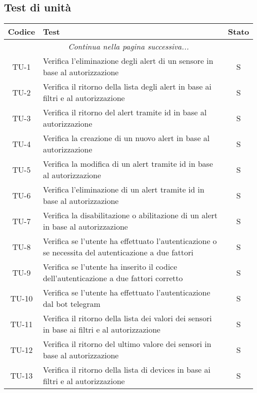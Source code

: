 	\subsection{Test di unità}

		\begin{center}
			\begin{longtable}{|c|p{12cm}|c|}
			\hline
			\rowcolor{lighter-grayer}
			\textbf{Codice} & \textbf{Test} & \textbf{Stato}  \\ %
			\hline
			\endhead
			\hline
	        \multicolumn{3}{|c|}{\textit{Continua nella pagina successiva...}}\\
	        \hline
	        \endfoot
	        \endlastfoot

			\hline
			TU-1 & Verifica l'eliminazione degli alert di un sensore in base al autorizzazione & S \\
			\hline
			TU-2 & Verifica il ritorno della lista degli alert in base ai filtri e al autorizzazione & S \\
			\hline
			TU-3 & Verifica il ritorno del alert tramite id in base al autorizzazione & S \\
			\hline
			TU-4 & Verifica la creazione di un nuovo alert in base al autorizzazione & S \\
			\hline
			TU-5 & Verifica la modifica di un alert tramite id in base al autorizzazione & S \\
			\hline
			TU-6 & Verifica l'eliminazione di un alert tramite id in base al autorizzazione & S \\
			\hline
			TU-7 & Verifica la disabilitazione o abilitazione di un alert in base al autorizzazione & S \\
			\hline
			TU-8 & Verifica se l'utente ha effettuato l'autenticazione o se necessita del autenticazione a due fattori & S \\
			\hline
			TU-9 & Verifica se l'utente ha inserito il codice dell'autenticazione a due fattori corretto & S \\
			\hline
			TU-10 & Verifica se l'utente ha effettuato l'autenticazione dal bot telegram & S \\
			\hline
			TU-11 & Verifica il ritorno della lista dei valori dei sensori in base ai filtri e al autorizzazione & S \\
			\hline
			TU-12 & Verifica il ritorno del ultimo valore dei sensori in base al autorizzazione & S \\
			\hline
			TU-13 & Verifica il ritorno della lista di devices in base ai filtri e al autorizzazione & S \\

\end{longtable}
\end{center}
